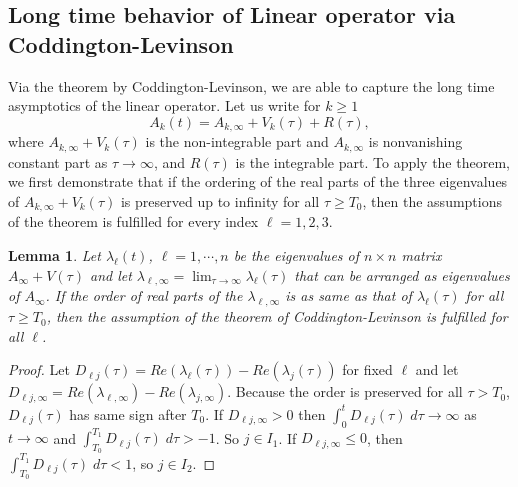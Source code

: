 \documentclass[a4paper,11pt]{article}
\newtheorem{lemma}{Lemma}[section]
\theoremstyle{remark}
\begin{document}
\subsection{Long time behavior of Linear operator via Coddington-Levinson}
Via the theorem by Coddington-Levinson, we are able to capture the long time asymptotics of the linear operator. Let us write for $k\ge1$
$$A_k(t) = A_{k,\infty} + V_k(\tau) + R(\tau),$$
where $A_{k,\infty}+V_k(\tau)$ is the non-integrable part and $A_{k,\infty}$ is nonvanishing constant part as $\tau \rightarrow \infty$, and $R(\tau)$ is the integrable part. To apply the theorem, we first demonstrate that if the ordering of the real parts of the three eigenvalues of $A_{k,\infty} + V_k(\tau)$ is preserved up to infinity for  all $\tau\ge T_0$, then the assumptions of the theorem is fulfilled for every index $\ell=1,2,3$. 
\begin{lemma}
 Let $\lambda_\ell(t)$, $\ell=1,\cdots,n$ be the eigenvalues of $n\times n$ matrix $A_{\infty} + V(\tau)$ and let $\displaystyle\lambda_{\ell,\infty}=\lim_{\tau \rightarrow \infty} \lambda_{\ell}(\tau)$ that can be arranged as  eigenvalues of $A_{\infty}$. If the order of real parts of the $\lambda_{\ell,\infty}$ is as same as that of $\lambda_\ell(\tau)$ for all $\tau \ge T_0$, then the assumption of the theorem of Coddington-Levinson is fulfilled for all $\ell$.
\end{lemma}
\begin{proof}
 Let $D_{\ell j}(\tau) = Re(\lambda_\ell (\tau)) - Re(\lambda_j(\tau))$ for fixed $\ell$ and let $\displaystyle D_{\ell j,\infty}=Re(\lambda_{\ell,\infty}) - Re(\lambda_{j,\infty})$. Because the order is preserved for all $\tau>T_0$, $D_{\ell j}(\tau)$ has same sign after $T_0$. If $D_{\ell j,\infty}>0$ then $\int_0^t D_{\ell j}(\tau) \;d\tau \rightarrow \infty$ as $t \rightarrow \infty$ and $\int_{T_0}^{T_1} D_{\ell j}(\tau) \; d\tau > -1$. So $j \in I_1$. If $D_{\ell j,\infty}\le0$, then $\int_{T_0}^{T_1} D_{\ell j}(\tau) \; d\tau < 1$, so $j \in I_2$.
\end{proof}
\end{document}
